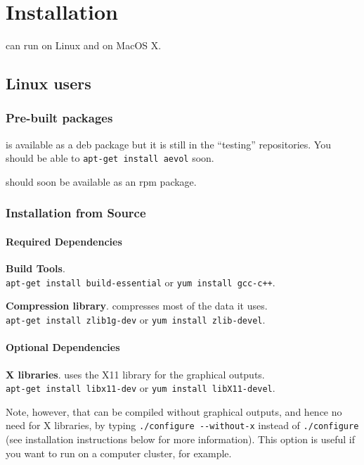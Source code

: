 \chapter{Installation}
\label{chap:install}


\vspace{5mm}

\aevol{} can run on Linux and on MacOS X.

\section{Linux users}
\label{sec:linux}

\subsection{Pre-built packages}
\aevol{} is available as a deb package but it is still in the ``testing'' repositories. You should be able to \verb?apt-get install aevol? soon.

\aevol{} should soon be available as an rpm package.


\subsection{Installation from Source}
\subsubsection{Required Dependencies}
\begin{myList} 
\item \textbf{Build Tools}.
\\\verb?apt-get install build-essential? or \verb?yum install gcc-c++?.
\item \textbf{Compression library}.
\aevol{} compresses most of the data it uses.\\\verb?apt-get install zlib1g-dev? or \verb?yum install zlib-devel?.
\end{myList}

\subsubsection{Optional Dependencies}
\begin{myList} 
\item \textbf{X libraries}.
\aevol{} uses the X11 library for the graphical outputs.\\\verb?apt-get install libx11-dev? or \verb?yum install libX11-devel?.

Note, however, that \aevol{} can be compiled without graphical outputs, and hence no need for X libraries, by typing  \verb?./configure --without-x?  instead of  \verb?./configure? (see installation instructions below for more information). This option is useful if you want to run \aevol{} on a computer cluster, for example.
\end{myList}

